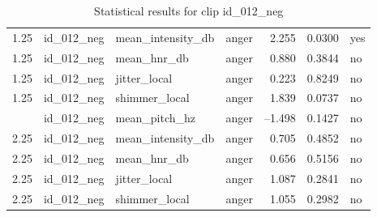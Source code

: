 \begin{table}[ht]
\begin{subtable}[t]{0.48\textwidth}
\begin{tabular}{l l l l r r l}
        1.25  & id\_012\_neg & mean\_intensity\_db & anger   &  2.255      & 0.0300    & yes \\
        1.25  & id\_012\_neg & mean\_hnr\_db       & anger   &  0.880      & 0.3844    & no  \\
        1.25  & id\_012\_neg & jitter\_local       & anger   &  0.223      & 0.8249    & no  \\
        1.25  & id\_012\_neg & shimmer\_local      & anger   &  1.839      & 0.0737    & no  \\
        \addlinespace
        2.25  & id\_012\_neg & mean\_pitch\_hz     & anger   & –1.498      & 0.1427    & no  \\
        2.25  & id\_012\_neg & mean\_intensity\_db & anger   &  0.705      & 0.4852    & no  \\
        2.25  & id\_012\_neg & mean\_hnr\_db       & anger   &  0.656      & 0.5156    & no  \\
        2.25  & id\_012\_neg & jitter\_local       & anger   &  1.087      & 0.2841    & no  \\
        2.25  & id\_012\_neg & shimmer\_local      & anger   &  1.055      & 0.2982    & no  \\
        \bottomrule
      \end{tabular}
    \end{subtable}
    \caption{Statistical results for clip id\_012\_neg}
    \label{tab:clip012_stats}
  \end{table}

